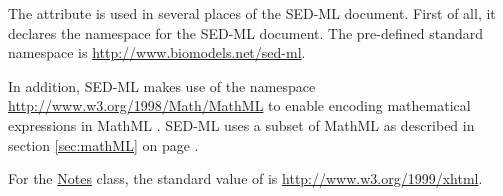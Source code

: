 \label{sec:xmlns}
The  attribute is used in several places of the SED-ML document.
First of all, it declares the namespace for the SED-ML document. The pre-defined standard namespace is \url{http://www.biomodels.net/sed-ml}. 

In addition, SED-ML makes use of the  namespace \url{http://www.w3.org/1998/Math/MathML} to enable encoding mathematical expressions in MathML \citep{CIM+01}. SED-ML uses a subset of MathML as described in section \ref{sec:mathML} on page \pageref{sec:mathML}.

For the \hyperref[class:notes]{Notes} class, the standard value of  is \url{http://www.w3.org/1999/xhtml}.


